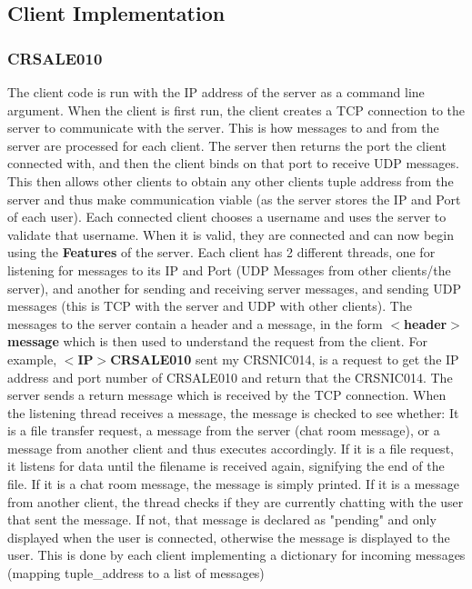\documentclass{article}
\begin{document}
\subsection{Client Implementation}
\subsubsection{CRSALE010}
The client code is run with the IP address of the server as a command line argument. When the client is first run, the client creates a TCP connection to the server to communicate with the server. This is how messages to and from the server are processed for each client. The server then returns the port the client connected with, and then the client binds on that port to receive UDP messages. This then allows other clients to obtain any other clients tuple address from the server and thus make communication viable (as the server stores the IP and Port of each user). Each connected client chooses a username and uses the server to validate that username. When it is valid, they are connected and can now begin using the \textbf{Features} of the server. Each client has 2 different threads, one for listening for messages to its IP and Port (UDP Messages from other clients/the server), and another for sending and receiving server messages, and sending UDP messages (this is TCP with the server and UDP with other clients). The messages to the server contain a header and a message, in the form \textbf{\(<\)header\(>\)message} which is then used to understand the request from the client. For example, \textbf{\(<\)IP\(>\)CRSALE010} sent my CRSNIC014, is a request to get the IP address and port number of CRSALE010 and return that the CRSNIC014. The server sends a return message which is received by the TCP connection. When the listening thread receives a message, the message is checked to see whether: It is a file transfer request, a message from the server (chat room message), or a message from another client and thus executes accordingly. If it is a file request, it listens for data until the filename is received again, signifying the end of the file. If it is a chat room message, the message is simply printed. If it is a message from another client, the thread checks if they are currently chatting with the user that sent the message. If not, that message is declared as "pending" and only displayed when the user is connected, otherwise the message is displayed to the user. This is done by each client implementing a dictionary for incoming messages (mapping tuple\_address to a list of messages)
\end{document}
